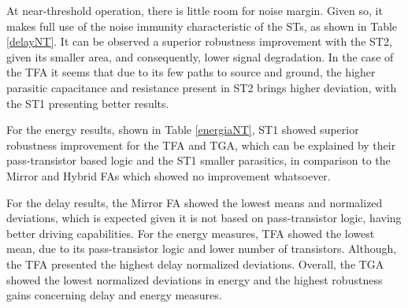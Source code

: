 \documentclass[pgmicro,mestrado,english]{iiufrgs}
\begin{document}
 At near-threshold operation, there is little room for noise margin. Given so, it makes full use of the noise immunity characteristic of the STs, as shown in Table \ref{delayNT}. It can be observed a superior robustness improvement with the ST2, given its smaller area, and consequently, lower signal degradation.
 In the case of the TFA it seems that due to its few paths to source and ground, the higher parasitic capacitance and resistance present in ST2 brings higher deviation, with the ST1 presenting better results.
 
 For the energy results, shown in Table \ref{energiaNT}, ST1 showed superior robustness improvement for the TFA and TGA, which can be explained by their pass-transistor based logic and the ST1 smaller parasitics, in comparison to the Mirror and Hybrid FAs which showed no improvement whatsoever.
 
 For the delay results, the Mirror FA showed the lowest means and normalized deviations, which is expected given it is not based on pass-transistor logic, having better driving capabilities. For the energy measures, TFA showed the lowest mean, due to its pass-transistor logic and lower number of transistors. Although, the TFA presented the highest delay normalized deviations. Overall, the TGA showed the lowest normalized deviations in energy and the highest robustness gains concerning delay and energy measures.
\end{document}
